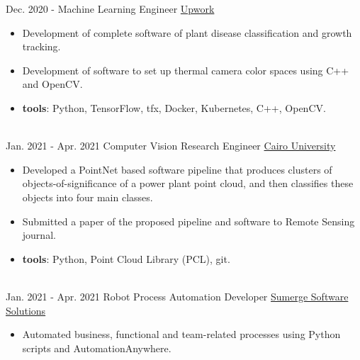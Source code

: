 \documentclass[a4paper]{twentysecondcv} %
\begin{document}
\begin{twenty} %




 \twentyitem
  {Dec. 2020 -}
{}
    {Machine Learning Engineer}
    {\href{https://www.upwork.com/freelancers/~01ec81ec5f74cf3ea8}{Upwork}}
    {}
    {\vspace{-2mm}\begin{itemize}[topsep=0pt,partopsep=0pt]
    \item Development of complete software of plant disease classification and growth tracking.
    \item Development of software to set up thermal camera color spaces using C++ and OpenCV.
    \item \textbf{tools}: Python, TensorFlow, tfx, Docker, Kubernetes, C++, OpenCV.
    \end{itemize}} \\

  \twentyitem
  {Jan. 2021 - Apr. 2021}
{}
    {Computer Vision Research Engineer}
    {\href{http://eng.cu.edu.eg/en/}{Cairo University}}
    {}
    {\vspace{-2mm}\begin{itemize}[topsep=0pt,partopsep=0pt]
    \item Developed a PointNet based software pipeline that produces clusters of objects-of-significance of a power plant point cloud, and then classifies these objects into four main classes.
    \item Submitted a paper of the proposed pipeline and software to Remote Sensing journal.
    \item \textbf{tools}: Python, Point Cloud Library (PCL), git.
    \end{itemize}} \\


  \twentyitem
  {Jan. 2021 - Apr. 2021}
{}
    {Robot Process Automation Developer}
    {\href{https://www.sumerge.com/}{Sumerge Software Solutions}}
    {}
    {\vspace{-2mm}\begin{itemize}[topsep=0pt,partopsep=0pt]
    \item Automated business, functional and team-related processes using Python scripts and AutomationAnywhere.
    \end{itemize}} \\
		

        
\end{twenty}
\end{document}
